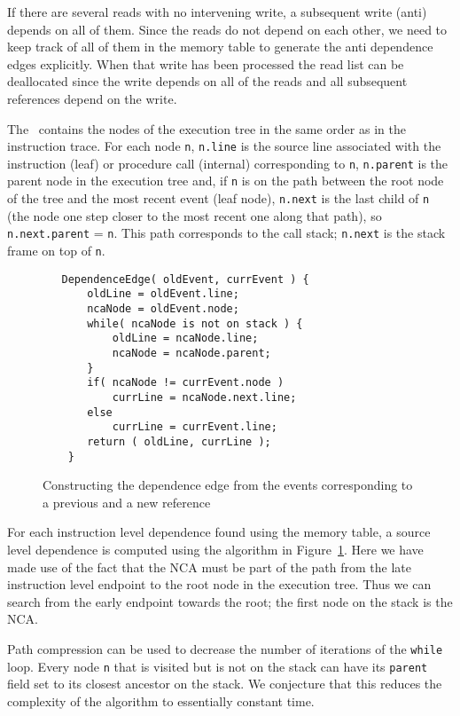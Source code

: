 \documentclass[times, 10pt,twocolumn]{article}
\begin{document}
If there are several reads with no intervening write, a subsequent write
(anti) depends on all of them. Since the reads do not depend on each other,
we need to keep track of all of them in the memory table to generate the
anti dependence edges explicitly. When that write has been processed 
the read list can be deallocated since
the write depends on all of the reads and
all subsequent references depend on the write.

The \tracepile\ contains the nodes of the execution tree in the same order
as in the instruction trace. For each node {\tt n}, {\tt n.line} is the 
source line associated with the instruction (leaf) or procedure call
(internal) 
corresponding to {\tt n}, {\tt n.parent} is the parent node in the execution tree 
and, if {\tt n} is 
on the path between the root node of the tree and the most recent 
event (leaf node), {\tt n.next} is the last child of {\tt n} (the node one step 
closer to the most recent one
along that path), so {\tt n.next.parent} = {\tt n}. This
path corresponds to the call stack; {\tt n.next} is the stack frame on
top of {\tt n}.

\begin{figure}
\small
\hrulefill
\begin{verbatim}
   DependenceEdge( oldEvent, currEvent ) {
       oldLine = oldEvent.line;
       ncaNode = oldEvent.node;
       while( ncaNode is not on stack ) {
           oldLine = ncaNode.line;
           ncaNode = ncaNode.parent;
       }
       if( ncaNode != currEvent.node )
           currLine = ncaNode.next.line;
       else
           currLine = currEvent.line;
       return ( oldLine, currLine );
    }
\end{verbatim}
\hrulefill
\caption{Constructing the dependence edge from the events corresponding
to a previous and a new reference}
\label{fdepedge}
\end{figure}    

For each instruction level dependence found using the memory table,
a source level dependence is computed using the algorithm in 
Figure~\ref{fdepedge}. Here we
have made use of the fact that the NCA must be part of the path from the
late instruction level endpoint to the root node in the execution tree. 
Thus
we can search from the early endpoint towards the root; the first node
on the stack is the NCA.

Path compression can be used to decrease the number of iterations of the 
{\tt while} loop.
Every node {\tt n} that is visited but is not on the stack can have its 
{\tt parent} field set
to its closest ancestor on the stack. We conjecture that this reduces the 
complexity of the algorithm to essentially constant time. 
\end{document}
